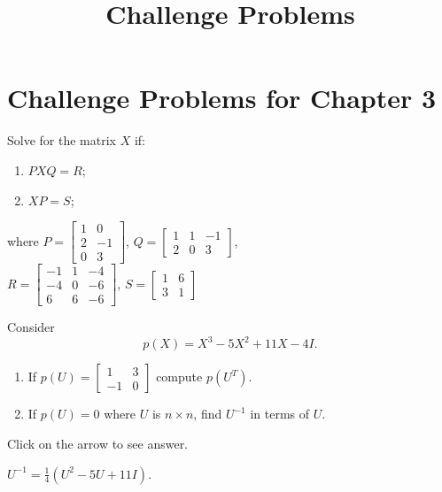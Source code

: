 \documentclass{ximera}
\title{Challenge Problems} \license{CC BY-NC-SA 4.0}
\begin{document}
\begin{abstract}
\end{abstract}
\maketitle

\section*{Challenge Problems for Chapter 3}

\begin{problem}\label{prob:4.75}
Solve for the matrix $X$ if:
\begin{enumerate}
\item $PXQ = R$;
\item $XP = S$;
\end{enumerate}
where
$
P = \left[ \begin{array}{rr}
1 & 0 \\
2 & -1 \\
0 & 3
\end{array} \right]$, $
Q = \left[ \begin{array}{rrr}
1 & 1 & -1 \\
2 & 0 & 3
\end{array} \right]$, \\ $
R = \left[ \begin{array}{rrr}
-1 & 1 & -4 \\
-4 & 0 & -6 \\
6 & 6 & -6
\end{array} \right]$, $
S = \left[ \begin{array}{rr}
1 & 6\\
3 & 1
\end{array} \right]$
\end{problem}

\begin{problem}\label{prob:4.76}
Consider \begin{equation*}
p(X) = X^{3} - 5X^{2} + 11X - 4I.
\end{equation*}

\begin{enumerate}
\item If $p(U) = \left[ \begin{array}{rr}
1 & 3 \\
-1 & 0
\end{array} \right]$
 compute $p(U^{T})$.

\item If $p(U) = 0$ where $U$ is $n \times n$, find $U^{-1}$ in terms of $U$.
\end{enumerate}

Click on the arrow to see answer.
\begin{expandable}
 $U^{-1} = \frac{1}{4}(U^{2} - 5U + 11I)$.
\end{expandable}
\end{problem}
\end{document}
